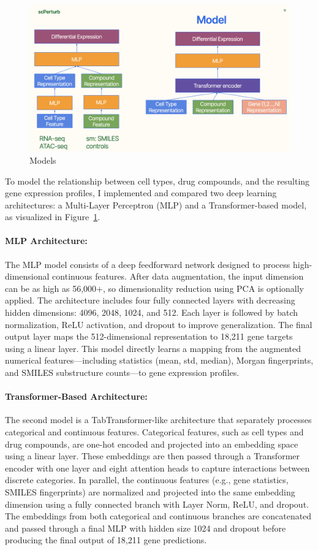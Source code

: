 \documentclass[11pt, oneside]{article}   	%
\begin{document}
\begin{figure}[htbp]
  \centering
  \includegraphics[width=1.0 \textwidth]{models.png}
  \caption{Models}
  \label{fig:models}
\end{figure}


To model the relationship between cell types, drug compounds, and the resulting gene expression profiles, I implemented and compared two deep learning architectures: a Multi-Layer Perceptron (MLP) and a Transformer-based model, as visualized in Figure~\ref{fig:models}.


\paragraph{MLP Architecture:}
The MLP model consists of a deep feedforward network designed to process high-dimensional continuous features. After data augmentation, the input dimension can be as high as 56,000+, so dimensionality reduction using PCA is optionally applied. The architecture includes four fully connected layers with decreasing hidden dimensions: 4096, 2048, 1024, and 512. Each layer is followed by batch normalization, ReLU activation, and dropout to improve generalization. The final output layer maps the 512-dimensional representation to 18,211 gene targets using a linear layer. This model directly learns a mapping from the augmented numerical features—including statistics (mean, std, median), Morgan fingerprints, and SMILES substructure counts—to gene expression profiles.


\paragraph{Transformer-Based Architecture:}
The second model is a TabTransformer-like architecture that separately processes categorical and continuous features. Categorical features, such as cell types and drug compounds, are one-hot encoded and projected into an embedding space using a linear layer. These embeddings are then passed through a Transformer encoder with one layer and eight attention heads to capture interactions between discrete categories. In parallel, the continuous features (e.g., gene statistics, SMILES fingerprints) are normalized and projected into the same embedding dimension using a fully connected branch with Layer Norm, ReLU, and dropout. The embeddings from both categorical and continuous branches are concatenated and passed through a final MLP with hidden size 1024 and dropout before producing the final output of 18,211 gene predictions.
\end{document}
